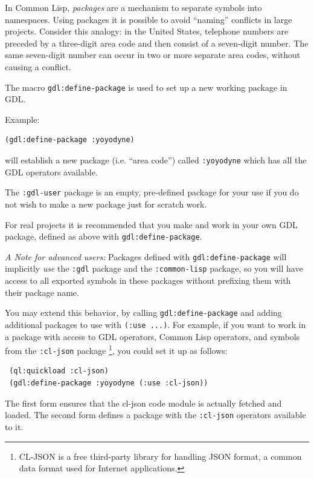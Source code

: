 \documentclass [11pt]{book}
\begin{document}
\label{sec:definingaworkingpackage}



In Common Lisp, \emph{packages} are a mechanism to separate symbols into
namespaces. Using packages it is possible to avoid ``naming'' conflicts in
large projects. Consider this analogy: in the United States, telephone
numbers are preceded by a three-digit area code and then consist of a
seven-digit number. The same seven-digit number can occur in two or
more separate area codes, without causing a conflict.



The macro \texttt{gdl:define-package} is used to set up a new working package in GDL.



 



Example:

\begin{verbatim}(gdl:define-package :yoyodyne)
\end{verbatim} will establish a new package (i.e. ``area code'')
called \texttt{:yoyodyne} which has all the GDL operators available.



The \texttt{:gdl-user} package is an empty, pre-defined package for your use if
you do not wish to make a new package just for scratch work.



For real projects it is recommended that you make and work in your own
GDL package, defined as above with \texttt{gdl:define-package}.



\emph{A Note for advanced users:} Packages defined with \texttt{gdl:define-package} will implicitly \emph{use} the \texttt{:gdl} package and the \texttt{:common-lisp} package, so you will have access to all exported symbols
  in these packages without prefixing them with their package name.

  You may extend this behavior, by calling \texttt{gdl:define-package} and adding additional packages to use with \texttt{(:use ...)}.  For example, if  you want to work in a package with access to GDL operators,
 Common Lisp operators, and symbols from the \texttt{:cl-json} package \footnote{CL-JSON is a free third-party library for handling JSON format, a common data format used 
for Internet applications.}, you could set it up as follows:

\begin{verbatim} (ql:quickload :cl-json)
 (gdl:define-package :yoyodyne (:use :cl-json))
\end{verbatim}The first form ensures that the cl-json code module is
actually fetched and loaded. The second form defines a package with
the \texttt{:cl-json} operators available to it.
\end{document}
